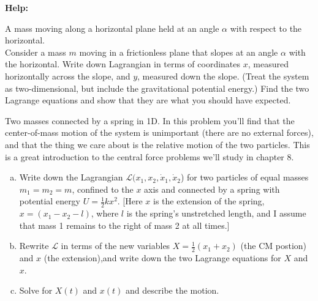 \documentclass[11pt,letterpaper,boxed]{../hmcpset}
\newcommand{\half}{\frac{1}{2}}
\begin{document}
\textbf{Help:}

\begin{problem}[7.4]
A mass moving along a horizontal plane held at an angle $\alpha$ with respect to the horizontal.\\
Consider a mass $m$ moving in a frictionless plane that slopes at an angle $\alpha$ with the horizontal.  Write down Lagrangian in terms of coordinates $x$, measured horizontally across the slope, and $y$, measured down the slope. (Treat the system as two-dimensional, but include the gravitational potential energy.) Find the two Lagrange equations and show that they are what you should have expected.
\end{problem}


\begin{solution}



\vfill
\end{solution}

\newpage

\begin{problem}[7.8]
Two masses connected by a spring in 1D. In this problem you'll find that the center-of-mass motion of the system is unimportant (there are no external forces), and that the thing we care about is the relative motion of the two particles. This is a great introduction to the central force problems we'll study in chapter 8.
\begin{enumerate}[(a)]
\item Write down the Lagrangian $\mathcal{L}(x_1, x_2, \dot x_1, \dot x_2$) for two particles of equal masses $m_1 = m_2 = m$, confined to the $x$ axis and connected by a spring with potential energy $U = \half k x^2$. [Here $x$ is the extension of the spring, $x = (x_1 - x_2 - l)$, where $l$ is the spring's unstretched length, and I assume that mass 1 remains to the right of mass 2 at all times.] 
\item Rewrite $\mathcal{L}$ in terms of the new variables $X = \half(x_1 + x_2)$ (the CM postion) and $x$ (the extension),and write down the two Lagrange equations for $X$ and $x$.
\item Solve for $X(t)$ and $x(t)$ and describe the motion.

\end{enumerate}

\end{problem}
\begin{solution}



\vfill
\end{solution}
\end{document}
